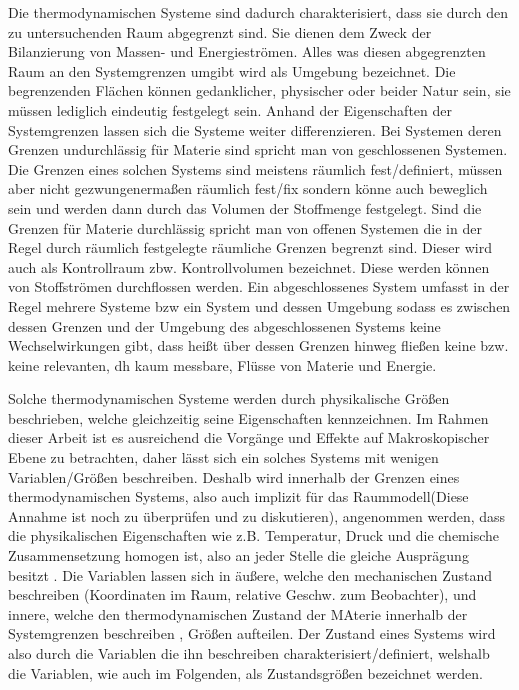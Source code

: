 Die thermodynamischen Systeme sind dadurch charakterisiert, dass sie durch den zu untersuchenden Raum abgegrenzt sind. Sie dienen dem Zweck der Bilanzierung von Massen- und Energieströmen. Alles was diesen abgegrenzten Raum an den Systemgrenzen umgibt wird als Umgebung bezeichnet. Die begrenzenden Flächen können gedanklicher, physischer oder beider Natur sein, sie müssen lediglich eindeutig festgelegt sein.
Anhand der Eigenschaften der Systemgrenzen lassen sich die Systeme weiter differenzieren.
Bei Systemen deren Grenzen undurchlässig für Materie sind spricht man von geschlossenen Systemen. Die Grenzen eines solchen Systems sind meistens räumlich fest/definiert, müssen aber nicht gezwungenermaßen räumlich fest/fix sondern könne auch beweglich sein und werden dann durch das Volumen der Stoffmenge festgelegt.
Sind die Grenzen für Materie durchlässig spricht man von offenen Systemen die in der Regel durch räumlich festgelegte räumliche Grenzen begrenzt sind. Dieser wird auch als Kontrollraum zbw. Kontrollvolumen bezeichnet. Diese werden können von Stoffströmen durchflossen werden.
Ein abgeschlossenes System umfasst in der Regel mehrere Systeme \acrlong{bzw} ein System und dessen Umgebung sodass es zwischen dessen Grenzen und der Umgebung des abgeschlossenen Systems keine Wechselwirkungen gibt, dass heißt über dessen Grenzen hinweg fließen keine bzw. keine relevanten, dh kaum messbare, Flüsse von Materie und Energie.


Solche thermodynamischen Systeme werden durch physikalische Größen beschrieben, welche gleichzeitig seine Eigenschaften kennzeichnen. Im Rahmen dieser Arbeit ist es ausreichend die Vorgänge und Effekte auf Makroskopischer Ebene zu betrachten, daher lässt sich ein solches Systems mit wenigen Variablen/Größen beschreiben.
Deshalb wird innerhalb der Grenzen eines thermodynamischen Systems, also auch implizit für das Raummodell(Diese Annahme ist noch zu überprüfen und zu diskutieren), angenommen werden, dass die physikalischen Eigenschaften wie z.B. Temperatur, Druck und die chemische Zusammensetzung homogen ist, also an jeder Stelle die gleiche Ausprägung besitzt \cite[S.15]{ba12} . 
Die Variablen lassen sich in äußere, welche den mechanischen Zustand beschreiben (Koordinaten im Raum, relative Geschw. zum Beobachter), und innere, welche den thermodynamischen Zustand der MAterie innerhalb der Systemgrenzen beschreiben , Größen aufteilen.
Der Zustand eines Systems wird also durch die Variablen die ihn beschreiben charakterisiert/definiert, welshalb die Variablen, wie auch im Folgenden, als Zustandsgrößen bezeichnet werden.
\cite[S.13~f.]{ba12}


